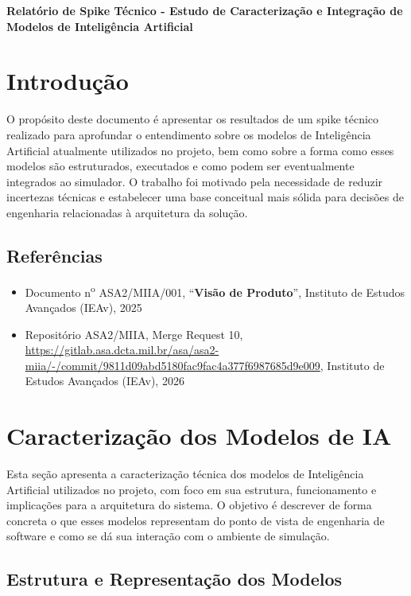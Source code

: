 \begin{center}
    \textbf{\Huge{Relatório de Spike Técnico - Estudo de Caracterização e Integração de Modelos de Inteligência Artificial}}
\end{center}

\section{Introdução}

O propósito deste documento é apresentar os resultados de um spike técnico realizado para aprofundar o entendimento sobre os modelos de Inteligência Artificial atualmente utilizados no projeto, bem como sobre a forma como esses modelos são estruturados, executados e como podem ser eventualmente integrados ao simulador. O trabalho foi motivado pela necessidade de reduzir incertezas técnicas e estabelecer uma base conceitual mais sólida para decisões de engenharia relacionadas à arquitetura da solução.

\subsection{Referências}

\begin{itemize}
    \item Documento n\textsuperscript{o} ASA2/MIIA/001, ``\textbf{Visão de Produto}'', Instituto de Estudos Avançados (IEAv), 2025
    \item Repositório ASA2/MIIA, Merge Request 10, \url{https://gitlab.asa.dcta.mil.br/asa/asa2-miia/-/commit/9811d09abd5180fac9fac4a377f6987685d9e009}, Instituto de Estudos Avançados (IEAv), 2026
\end{itemize}
\newpage

\section{Caracterização dos Modelos de IA}

Esta seção apresenta a caracterização técnica dos modelos de Inteligência Artificial utilizados no projeto, com foco em sua estrutura, funcionamento e implicações para a arquitetura do sistema. O objetivo é descrever de forma concreta o que esses modelos representam do ponto de vista de engenharia de software e como se dá sua interação com o ambiente de simulação.

\subsection{Estrutura e Representação dos Modelos}

